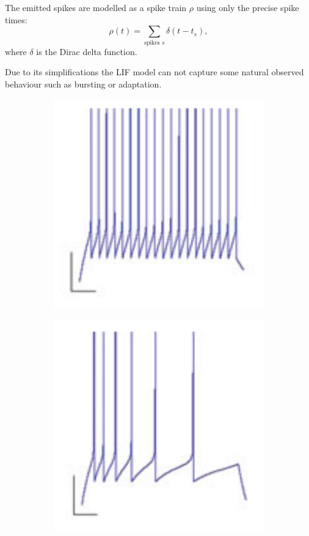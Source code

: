 The emitted spikes are modelled as a spike train $\rho$ using only the precise spike times:
\[
\rho(t) = \sum_{\text{spikes } s} \delta(t-t_s),
\] 
where $\delta$ is the Dirac delta function.

Due to its simplifications the LIF model can not capture some natural observed behaviour such as bursting or adaptation. 

\begin{figure}
	\centering
	\begin{subfigure}[t]{.32\textwidth}
	 	\centering
  		\includegraphics[width=.9\linewidth]{imgs/lif_bad1.png}
	\end{subfigure}
	\begin{subfigure}[t]{.32\textwidth}
	 	\centering
  		\includegraphics[width=.9\linewidth]{imgs/lif_bad2.png}

\end{subfigure}
\end{figure}
